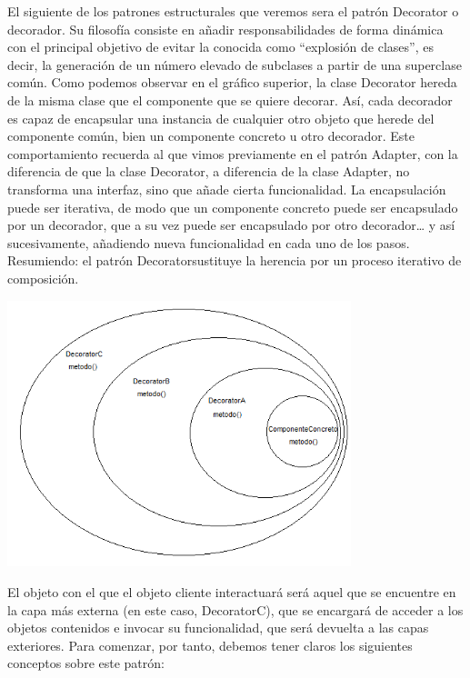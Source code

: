 \begin{flushleft}

El siguiente de los patrones estructurales que veremos sera el patrón Decorator o decorador. Su filosofía consiste en añadir responsabilidades de forma dinámica con el principal objetivo de evitar la conocida como “explosión de clases”, es decir, la generación de un número elevado de subclases a partir de una superclase común.
Como podemos observar en el gráfico superior, la clase Decorator hereda de la misma clase que el componente que se quiere decorar. Así, cada decorador es capaz de encapsular una instancia de cualquier otro objeto que herede del componente común, bien un componente concreto u otro decorador. Este comportamiento recuerda al que vimos previamente en el patrón Adapter, con la diferencia de que la clase Decorator, a diferencia de la clase Adapter, no transforma una interfaz, sino que añade cierta funcionalidad.
La encapsulación puede ser iterativa, de modo que un componente concreto puede ser encapsulado por un decorador, que a su vez puede ser encapsulado por otro decorador… y así sucesivamente, añadiendo nueva funcionalidad en cada uno de los pasos. Resumiendo: el patrón Decoratorsustituye la herencia por un proceso iterativo de composición.


\begin{center}
	\includegraphics[width=10cm]{./Imagenes/decorator2} 
	\end{center}

El objeto con el que el objeto cliente interactuará será aquel que se encuentre en la capa más externa (en este caso, DecoratorC), que se encargará de acceder a los objetos contenidos e invocar su funcionalidad, que será devuelta a las capas exteriores.
Para comenzar, por tanto, debemos tener claros los siguientes conceptos sobre este patrón:


\end{flushleft}

